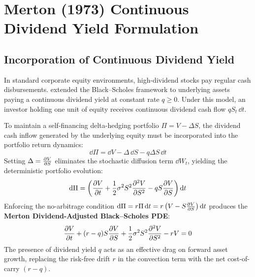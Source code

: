
\section{Merton (1973) Continuous Dividend Yield Formulation}
\label{sec:merton_dividend_model}

\subsection{Incorporation of Continuous Dividend Yield}

In standard corporate equity environments, high-dividend stocks pay regular cash disbursements. \citet{merton1973theory} extended the Black--Scholes framework to underlying assets paying a continuous dividend yield at constant rate $q \ge 0$. Under this model, an investor holding one unit of equity receives continuous dividend cash flow $q S_t \, \dd t$.

To maintain a self-financing delta-hedging portfolio $\Pi = V - \Delta S$, the dividend cash inflow generated by the underlying equity must be incorporated into the portfolio return dynamics:
\begin{equation}
    \dd \Pi = \dd V - \Delta \, \dd S - q \Delta S \, \dd t
    \label{eq:dpi_dividend}
\end{equation}
Setting $\Delta = \frac{\partial V}{\partial S}$ eliminates the stochastic diffusion term $\dd W_t$, yielding the deterministic portfolio evolution:
\begin{equation}
    \mathrm{d} \Pi = \left( \frac{\partial V}{\partial t} + \frac{1}{2}\sigma^2 S^2 \frac{\partial^2 V}{\partial S^2} - q S \frac{\partial V}{\partial S} \right) \mathrm{d} t
    \label{eq:dpi_det_dividend}
\end{equation}
Enforcing the no-arbitrage condition $\mathrm{d} \Pi = r \Pi \, \mathrm{d} t = r \left( V - S \frac{\partial V}{\partial S} \right) \mathrm{d} t$ produces the \textbf{Merton Dividend-Adjusted Black--Scholes PDE}:
\begin{equation}
    \frac{\partial V}{\partial t} + (r - q) S \frac{\partial V}{\partial S} + \frac{1}{2}\sigma^2 S^2 \frac{\partial^2 V}{\partial S^2} - r V = 0
    \label{eq:merton_pde}
\end{equation}
The presence of dividend yield $q$ acts as an effective drag on forward asset growth, replacing the risk-free drift $r$ in the convection term with the net cost-of-carry $(r - q)$.

